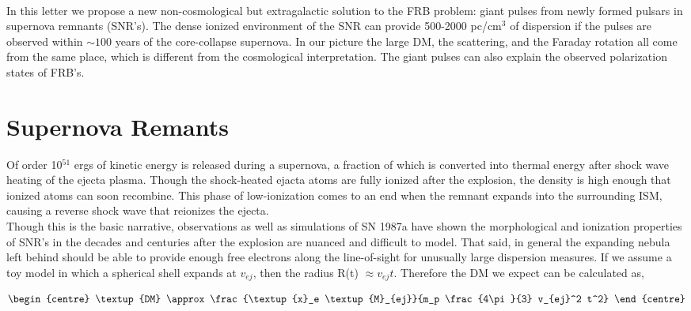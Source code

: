 \documentclass[useAMS,usenatbib]{mn2e}
\begin{document}
\\
In this letter we propose a new non-cosmological but extragalactic
solution to the FRB problem: giant pulses from newly formed pulsars in 
supernova remnants (SNR's). The dense ionized environment of the SNR
can provide 500-2000 pc/cm$^3$ of dispersion if the pulses are observed 
within $\sim100$ years of the core-collapse supernova. In our picture the 
large DM, the scattering, and the Faraday rotation all come from the same place, 
which is different from the cosmological interpretation.
The giant pulses can also explain the observed polarization states of FRB's. 


\section{Supernova Remants}
Of order 10$^{51}$ ergs of kinetic energy is released during a supernova, a 
fraction of which is converted into thermal 
energy after shock wave heating of the 
ejecta plasma. Though the shock-heated ejacta atoms 
are fully ionized after the explosion, the density is high enough that
ionized atoms can soon recombine.
This phase of low-ionization comes to an end when the remnant expands 
into the surrounding ISM, causing a reverse shock wave that reionizes the ejecta.
\\
Though this is the basic narrative, observations \citep{2014ApJ...796...82Z} 
as well as simulations \citep{2014ApJ...794..174P}
of SN 1987a have shown the morphological and ionization properties of SNR's
in the decades and centuries after the explosion are nuanced and 
difficult to model.
That said, in general the expanding nebula left behind 
should be able to provide enough free electrons
along the line-of-sight for unusually large dispersion measures. If we 
assume a toy model in which a spherical shell expands at $v_{ej}$, 
then the radius R(t) $\approx v_{ej} t$. Therefore the DM we expect can be 
calculated as,

\begin{equation}
\begin{centre}
\textup{DM} \approx  \frac{\textup{x}_e \textup{M}_{ej}}{m_p \frac{4\pi}{3} v_{ej}^2 t^2}
\end{centre}
\end{equation}
\end{document}
